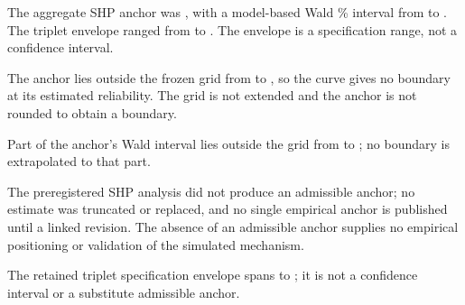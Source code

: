 The aggregate SHP anchor was , with a model-based Wald \% interval from  to . The triplet envelope ranged from  to . %
The envelope is a specification range, not a confidence interval. %

The anchor lies outside the frozen grid from  to , so the curve gives no boundary at its estimated reliability. %
The grid is not extended and the anchor is not rounded to obtain a boundary. %

Part of the anchor's Wald interval lies outside the grid from  to ; no boundary is extrapolated to that part. %

The preregistered SHP analysis did not produce an admissible anchor; no estimate was truncated or replaced, and no single empirical anchor is published until a linked revision. %
The absence of an admissible anchor supplies no empirical positioning or validation of the simulated mechanism. %

The retained triplet specification envelope spans  to ; it is not a confidence interval or a substitute admissible anchor. %

